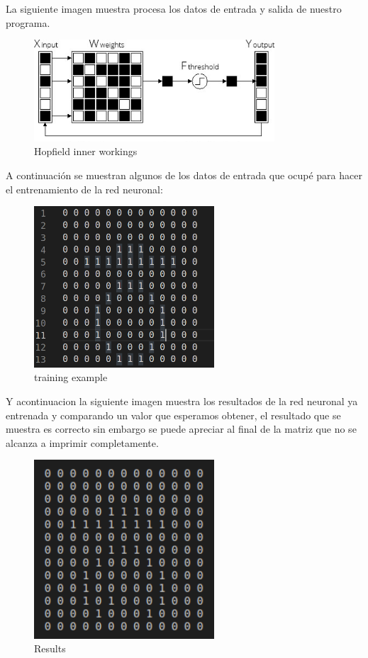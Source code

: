 \documentclass[10pt]{article}         %
\begin{document}
La siguiente imagen muestra procesa los datos de entrada y salida de nuestro programa.


\begin{figure}[htb]
\centering
\includegraphics[width=0.8\textwidth]{hopfield-network.jpg}
\caption{Hopfield inner workings}
\label{fig:tigre}
\end{figure}

A continuación se muestran algunos de los datos de entrada que ocupé para hacer el entrenamiento de la red neuronal:
\\

\begin{figure}[htb]
\centering
\includegraphics[width=0.6\textwidth]{letra_coreana_Ej1.png}
\caption{training example}
\label{fig:tigre}
\end{figure}

Y acontinuacion la siguiente imagen muestra los resultados de la red neuronal ya entrenada y comparando un valor que esperamos obtener, el resultado que se muestra es correcto sin embargo se puede apreciar al final de la matriz que no se alcanza a imprimir completamente.

\begin{figure}[htb]
\centering
\includegraphics[width=0.6\textwidth]{code.png}
\caption{Results}
\label{fig:tigre}
\end{figure}
\end{document}
